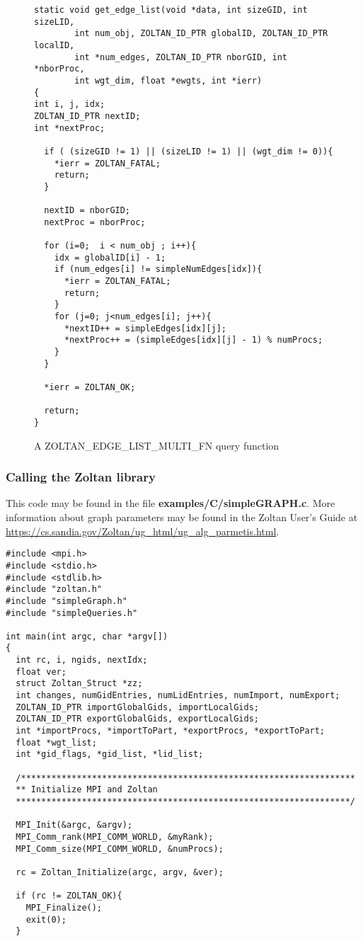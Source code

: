\begin{figure}
\begin{flushleft}
\begin{verbatim}
static void get_edge_list(void *data, int sizeGID, int sizeLID,
        int num_obj, ZOLTAN_ID_PTR globalID, ZOLTAN_ID_PTR localID,
        int *num_edges, ZOLTAN_ID_PTR nborGID, int *nborProc,
        int wgt_dim, float *ewgts, int *ierr)
{
int i, j, idx;
ZOLTAN_ID_PTR nextID;
int *nextProc;

  if ( (sizeGID != 1) || (sizeLID != 1) || (wgt_dim != 0)){
    *ierr = ZOLTAN_FATAL;
    return;
  }

  nextID = nborGID;
  nextProc = nborProc;

  for (i=0;  i < num_obj ; i++){
    idx = globalID[i] - 1;
    if (num_edges[i] != simpleNumEdges[idx]){
      *ierr = ZOLTAN_FATAL;
      return;
    }
    for (j=0; j<num_edges[i]; j++){
      *nextID++ = simpleEdges[idx][j];
      *nextProc++ = (simpleEdges[idx][j] - 1) % numProcs;
    }
  }

  *ierr = ZOLTAN_OK;

  return;
}
\end{verbatim}
\end{flushleft}
\caption{A ZOLTAN\_EDGE\_LIST\_MULTI\_FN query function}
\label{fig:EdgeListMulti}
\end{figure}

\clearpage

\subsubsection{Calling the Zoltan library}

This code may be found in the 
file \textbf{examples/C/simpleGRAPH.c}.
More information about graph parameters 
may be found in the Zoltan User's Guide at
\url{https://cs.sandia.gov/Zoltan/ug_html/ug_alg_parmetis.html}.

\begin{flushleft}
\begin{verbatim}
#include <mpi.h>
#include <stdio.h>
#include <stdlib.h>
#include "zoltan.h"
#include "simpleGraph.h"
#include "simpleQueries.h"

int main(int argc, char *argv[])
{
  int rc, i, ngids, nextIdx;
  float ver;
  struct Zoltan_Struct *zz;
  int changes, numGidEntries, numLidEntries, numImport, numExport;
  ZOLTAN_ID_PTR importGlobalGids, importLocalGids;
  ZOLTAN_ID_PTR exportGlobalGids, exportLocalGids;
  int *importProcs, *importToPart, *exportProcs, *exportToPart;
  float *wgt_list;
  int *gid_flags, *gid_list, *lid_list;

  /******************************************************************
  ** Initialize MPI and Zoltan
  ******************************************************************/

  MPI_Init(&argc, &argv);
  MPI_Comm_rank(MPI_COMM_WORLD, &myRank);
  MPI_Comm_size(MPI_COMM_WORLD, &numProcs);

  rc = Zoltan_Initialize(argc, argv, &ver);

  if (rc != ZOLTAN_OK){
    MPI_Finalize();
    exit(0);
  }
\end{verbatim}
\end{flushleft}

